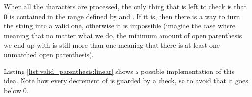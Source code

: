 When all the characters are processed, the only thing that is left to check is that $0$ is contained in the range defined by  and . If it is, then there is a way to turn the string into a valid one, otherwise it is impossible (imagine the case where  meaning that no matter what we do, the minimum amount of open parenthesis we end up with is still more than one meaning that there is at least one unmatched open parenthesis).

Listing \ref{list:valid_parenthesis:linear} shows a possible implementation of this idea. Note how every decrement of  is guarded by a check, so to avoid that it goes below $0$.

